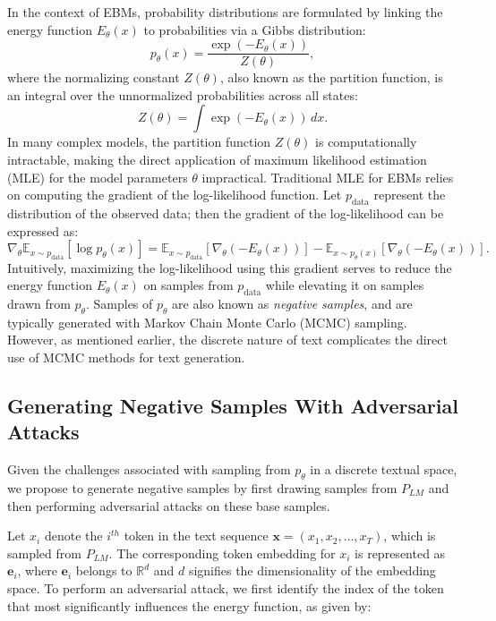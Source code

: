 \documentclass{article}
\begin{document}
In the context of EBMs, probability distributions are formulated by linking the energy function \( E_\theta(x) \) to probabilities via a Gibbs distribution:
\begin{equation}
p_\theta(x) = \frac{\exp \left(-E_\theta(x)\right)}{Z(\theta)},
\end{equation}
where the normalizing constant \( Z(\theta) \), also known as the partition function, is an integral over the unnormalized probabilities across all states:
\begin{equation}
Z(\theta) = \int \exp \left(-E_\theta(x)\right) \, dx.
\end{equation}
In many complex models, the partition function \( Z(\theta) \) is computationally intractable, making the direct application of maximum likelihood estimation (MLE) for the model parameters \( \theta \) impractical. Traditional MLE for EBMs relies on computing the gradient of the log-likelihood function. Let \( p_{\text{data}} \) represent the distribution of the observed data; then the gradient of the log-likelihood can be expressed as:
\begin{equation}
\nabla_\theta \mathbb{E}_{x \sim p_{\text{data}}}\left[\log p_\theta(x)\right] = \mathbb{E}_{x \sim p_{\text{data}}}\left[\nabla_\theta (-E_\theta(x))\right] - \mathbb{E}_{x \sim p_\theta(x)}\left[\nabla_\theta (-E_\theta(x))\right].
\end{equation}
Intuitively, maximizing the log-likelihood using this gradient serves to reduce the energy function \( E_\theta(x) \) on samples from \( p_{\text{data}} \) while elevating it on samples drawn from \( p_\theta \). Samples of \( p_\theta \) are also known as \emph{negative samples}, and are typically generated with Markov Chain Monte Carlo (MCMC) sampling. However, as mentioned earlier, the discrete nature of text complicates the direct use of MCMC methods for text generation. 


\subsection{Generating Negative Samples With Adversarial Attacks}
\label{sec:attack}
Given the challenges associated with sampling from \( p_\theta \) in a discrete textual space, we propose to generate negative samples by first drawing samples from  \( P_{LM}\) and then performing adversarial attacks on these base samples. 


Let \( x_i \) denote the \( i^{th} \) token in the text sequence \( \mathbf{x} = (x_1, x_2, \ldots, x_T) \), which is sampled from \( P_{LM} \). The corresponding token embedding for \( x_i \) is represented as \( \mathbf{e}_i \), where \( \mathbf{e}_i \) belongs to \( \mathbb{R}^d \) and \( d \) signifies the dimensionality of the embedding space. To perform an adversarial attack, we first identify the index of the token that most significantly influences the energy function, as given by:
\end{document}

